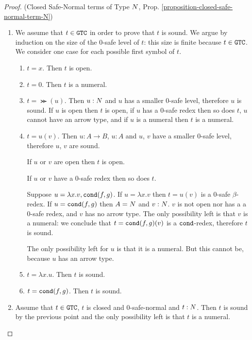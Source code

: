 \begin{proof}(Closed Safe-Normal terms of Type ${N}$, Prop. \ref{proposition-closed-safe-normal-term-N})
\begin{enumerate}
\item
We assume that $t \in {\tt GTC}$ in order to prove that $t$ is sound.
We argue by  induction on the size of the $0$-safe level of $t$: this size is finite because $t \in {\tt GTC}$. 
We consider one case for each possible first symbol of $t$.

\begin{enumerate}
\item
$t =x$. Then $t$ is open.
\item
$t=0$. Then $t$ is a numeral.
\item
$t = \Succ(u)$. Then $u:{N}$ and $u$ has a smaller $0$-safe level, therefore $u$ is sound. If $u$ is open then
$t$ is open, if $u$ has a $0$-safe redex then so does $t$, $u$ cannot have an arrow type, and if $u$
is a numeral then $t$ is a numeral.
\item
$t=u(v)$. Then $u:A \rightarrow B$, $u:A$ and $u$, $v$ have a smaller $0$-safe level, therefore $u$,
$v$ are sound. 

If $u$ or $v$ are open then $t$ is open. 

If $u$ or $v$ have a $0$-safe redex then so does $t$.

Suppose $u = \lambda x.v, {\tt cond}(f,g)$. If $u = \lambda x.v$ then $t=u(v)$ is a $0$-safe $\beta$-redex.
If $u = {\tt cond}(f,g)$ then $A = {N}$ and $v:{N}$. $v$ is not open nor has a a $0$-safe redex, and $v$ has no
arrow type. The only possibility left is that $v$ is a numeral: we conclude that $t={\tt cond}(f,g)(v)$ is a ${\tt cond}$-redex, therefore $t$ is sound.

The only possibility left for $u$ is that it is a numeral. But this cannot be, because $u$ has an arrow type.

\item
$t = \lambda x.u$. Then $t$ is sound.

\item
$t = {\tt cond}(f,g)$. Then $t$ is sound.
\end{enumerate}

\item
Assume that $t \in {\tt GTC}$, $t$ is closed and $0$-safe-normal and $t:{N}$.
Then $t$ is sound by the previous point and the only possibility left is that $t$ is 
a numeral.
\end{enumerate}
\end{proof}
